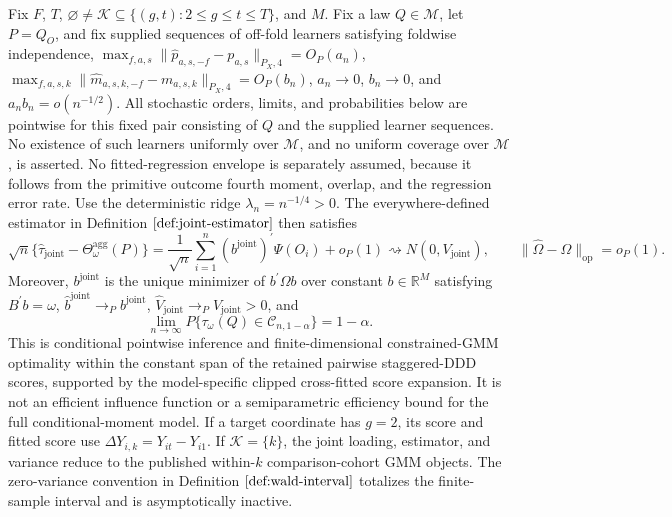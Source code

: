 Fix \(F\), \(T\), \(\varnothing\ne\mathcal K\subseteq\{(g,t):2\le g\le t\le T\}\), and \(M\). Fix a law \(Q\in\mathcal M\), let \(P=Q_O\), and fix supplied sequences of off-fold learners satisfying foldwise independence, \(\max_{f,a,s}\|\widehat p_{a,s,-f}-p_{a,s}\|_{P_X,4}=O_P(a_n)\), \(\max_{f,a,s,k}\|\widehat m_{a,s,k,-f}-m_{a,s,k}\|_{P_X,4}=O_P(b_n)\), \(a_n\to0\), \(b_n\to0\), and \(a_nb_n=o(n^{-1/2})\). All stochastic orders, limits, and probabilities below are pointwise for this fixed pair consisting of \(Q\) and the supplied learner sequences. No existence of such learners uniformly over \(\mathcal M\), and no uniform coverage over \(\mathcal M\), is asserted. No fitted-regression envelope is separately assumed, because it follows from the primitive outcome fourth moment, overlap, and the regression error rate. Use the deterministic ridge \(\lambda_n=n^{-1/4}>0\). The everywhere-defined estimator in Definition \(\ref{def:joint-estimator}\) then satisfies
\[
\sqrt n\{\widehat\tau_{\mathrm{joint}}-\Theta_\omega^{\mathrm{agg}}(P)\}
=\frac{1}{\sqrt n}\sum_{i=1}^n(b^{\mathrm{joint}})^{\prime}\Psi(O_i)+o_P(1)
\rightsquigarrow N(0,V_{\mathrm{joint}}),
\qquad
\|\widehat\Omega-\Omega\|_{\mathrm{op}}=o_P(1).
\]
Moreover, \(b^{\mathrm{joint}}\) is the unique minimizer of \(b^{\prime}\Omega b\) over constant \(b\in\mathbb R^M\) satisfying \(B^{\prime}b=\omega\), \(\widehat b^{\mathrm{joint}}\to_Pb^{\mathrm{joint}}\), \(\widehat V_{\mathrm{joint}}\to_PV_{\mathrm{joint}}>0\), and
\[
\lim_{n\to\infty}P\{\tau_\omega(Q)\in\mathcal C_{n,1-\alpha}\}=1-\alpha.
\]
This is conditional pointwise inference and finite-dimensional constrained-GMM optimality within the constant span of the retained pairwise staggered-DDD scores, supported by the model-specific clipped cross-fitted score expansion. It is not an efficient influence function or a semiparametric efficiency bound for the full conditional-moment model. If a target coordinate has \(g=2\), its score and fitted score use \(\Delta Y_{i,k}=Y_{it}-Y_{i1}\). If \(\mathcal K=\{k\}\), the joint loading, estimator, and variance reduce to the published within-\(k\) comparison-cohort GMM objects. The zero-variance convention in Definition \(\ref{def:wald-interval}\) totalizes the finite-sample interval and is asymptotically inactive.